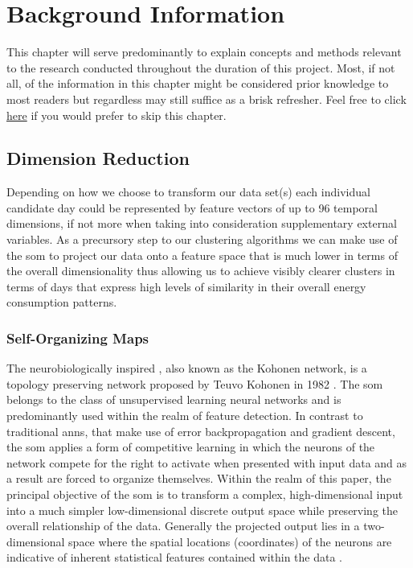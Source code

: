 \chapter{Background Information}
\label{ch:Background-Information}
This chapter will serve predominantly to explain concepts and methods relevant to the research conducted throughout the duration of this project. Most, if not all, of the information in this chapter might be considered prior knowledge to most readers but regardless may still suffice as a brisk refresher. Feel free to click \hyperref[ch:Data-Description]{here} if you would prefer to skip this chapter.

\section{Dimension Reduction}
\label{sec:Background-Information:Dimension-Reduction}
Depending on how we choose to transform our data set(s) each individual candidate day could be represented by feature vectors of up to 96 temporal dimensions, if not more when taking into consideration supplementary external variables. As a precursory step to our clustering algorithms we can make use of the \gls{som} to project our data onto a feature space that is much lower in terms of the overall dimensionality thus allowing us to achieve visibly clearer clusters in terms of days that express high levels of similarity in their overall energy consumption patterns.

\subsection{Self-Organizing Maps}
\label{subsec:Background-Information:Dimension-Reduction:Self-Organizing-Maps}
The neurobiologically inspired , also known as the Kohonen network, is a topology preserving network proposed by Teuvo Kohonen in 1982 \cite{Kohonen}. The \gls{som} belongs to the class of unsupervised learning neural networks and is predominantly used within the realm of feature detection. In contrast to traditional \glspl{ann}, that make use of error backpropagation and gradient descent, the \gls{som} applies a form of competitive learning in which the neurons of the network compete for the right to activate when presented with input data and as a result are forced to organize themselves. Within the realm of this paper, the principal objective of the \gls{som} is to transform a complex, high-dimensional input into a much simpler low-dimensional discrete output space while preserving the overall relationship of the data. Generally the projected output lies in a two-dimensional space where the spatial locations (\ie coordinates) of the neurons are indicative of inherent statistical features contained within the data \cite{Asan}.

